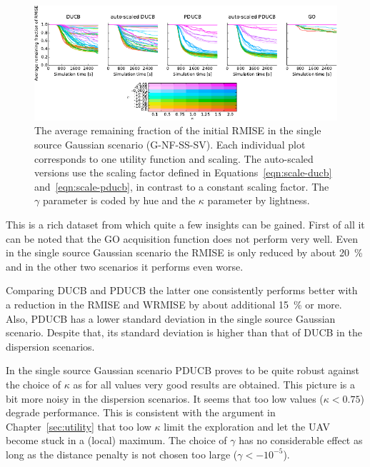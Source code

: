 \begin{figure}
    \centering
    \includegraphics{plots/errtrace-nf}
    \caption[Time-course of the error reduction]{The average remaining fraction 
        of the initial RMISE in the single source Gaussian scenario 
        (G-NF-SS-SV).  Each individual plot corresponds to one utility function 
        and scaling.  The auto-scaled versions use the scaling factor defined in 
        Equations~\ref{eqn:scale-ducb} and~\ref{eqn:scale-pducb}, in contrast to 
        a constant scaling factor. The $\gamma$ parameter is coded by hue and 
        the $\kappa$ parameter by lightness.}\label{fig:errtrace-nf}
\end{figure}

This is a rich dataset from which quite a few insights can be gained. First of 
all it can be noted that the GO acquisition function does not perform very well.  
Even in the single source Gaussian scenario the RMISE is only reduced by about 
\SI{20}{\percent} and in the other two scenarios it performs even worse.

Comparing DUCB and PDUCB the latter one consistently performs better with 
a reduction in the RMISE and WRMISE by about additional \SI{15}{\percent} or 
more. Also, PDUCB has a lower standard deviation in the single source Gaussian 
scenario. Despite that, its standard deviation is higher than that of DUCB in 
the dispersion scenarios.

In the single source Gaussian scenario PDUCB proves to be quite robust against 
the choice of $\kappa$ as for all values very good results are obtained. This 
picture is a bit more noisy in the dispersion scenarios. It seems that too low 
values ($\kappa < 0.75$) degrade performance. This is consistent with the 
argument in Chapter~\ref{sec:utility} that too low $\kappa$ limit the 
exploration and let the UAV become stuck in a (local) maximum. The choice of 
$\gamma$ has no considerable effect as long as the distance penalty is not 
chosen too large ($\gamma < -10^{-5}$).

